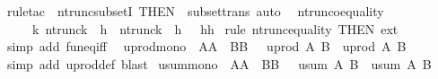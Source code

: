 \begin{isabellebody}
\isamarkupfalse%
\ {\isacharparenleft}rule{\isacharunderscore}tac\ {\isacharbrackleft}{\isacharbang}{\isacharbrackright}\ ntrunc{\isacharunderscore}subsetI\ {\isacharbrackleft}THEN\ {\isacharbrackleft}{}{\isacharbrackright}\ subset{\isacharunderscore}trans{\isacharbrackright}{\isacharcomma}\ auto{\isacharparenright}\ \isanewline
{}\isamarkupfalse%
%
\endisatagproof
{\isafoldproof}%
%
\isadelimproof
\isanewline
%
\endisadelimproof
\isanewline
{}\isamarkupfalse%
\ ntrunc{\isacharunderscore}o{\isacharunderscore}equality{\isacharcolon}\ \isanewline
\ \ \ \ {\isachardoublequoteopen}{\isacharbrackleft}{\isacharbar}\ {\isacharbang}{\isacharbang}k{\isachardot}\ {\isacharparenleft}ntrunc{\isacharparenleft}k{\isacharparenright}\ {\isasymcirc}\ h{}{\isacharparenright}\ {\isacharequal}\ {\isacharparenleft}ntrunc{\isacharparenleft}k{\isacharparenright}\ {\isasymcirc}\ h{}{\isacharparenright}\ {\isacharbar}{\isacharbrackright}\ {\isacharequal}{\isacharequal}{\isachargreater}\ h{}{\isacharequal}h{}{\isachardoublequoteclose}\isanewline
%
\isadelimproof
%
\endisadelimproof
%
\isatagproof
{}\isamarkupfalse%
\ {\isacharparenleft}rule\ ntrunc{\isacharunderscore}equality\ {\isacharbrackleft}THEN\ ext{\isacharbrackright}{\isacharparenright}\isanewline
{}\isamarkupfalse%
\ {\isacharparenleft}simp\ add{\isacharcolon}\ fun{\isacharunderscore}eq{\isacharunderscore}iff{\isacharparenright}\ \isanewline
{}\isamarkupfalse%
%
\endisatagproof
{\isafoldproof}%
%
\isadelimproof
\isanewline
%
\endisadelimproof
\isanewline
\isanewline
\isanewline
\isanewline
{}\isamarkupfalse%
\ uprod{\isacharunderscore}mono{\isacharcolon}\ {\isachardoublequoteopen}{\isacharbrackleft}{\isacharbar}\ A{\isacharless}{\isacharequal}A{\isacharprime}{\isacharsemicolon}\ \ B{\isacharless}{\isacharequal}B{\isacharprime}\ {\isacharbar}{\isacharbrackright}\ {\isacharequal}{\isacharequal}{\isachargreater}\ uprod\ A\ B\ {\isacharless}{\isacharequal}\ uprod\ A{\isacharprime}\ B{\isacharprime}{\isachardoublequoteclose}\isanewline
%
\isadelimproof
%
\endisadelimproof
%
\isatagproof
{}\isamarkupfalse%
\ {\isacharparenleft}simp\ add{\isacharcolon}\ uprod{\isacharunderscore}def{\isacharcomma}\ blast{\isacharparenright}%
\endisatagproof
{\isafoldproof}%
%
\isadelimproof
\isanewline
%
\endisadelimproof
\isanewline
{}\isamarkupfalse%
\ usum{\isacharunderscore}mono{\isacharcolon}\ {\isachardoublequoteopen}{\isacharbrackleft}{\isacharbar}\ A{\isacharless}{\isacharequal}A{\isacharprime}{\isacharsemicolon}\ \ B{\isacharless}{\isacharequal}B{\isacharprime}\ {\isacharbar}{\isacharbrackright}\ {\isacharequal}{\isacharequal}{\isachargreater}\ usum\ A\ B\ {\isacharless}{\isacharequal}\ usum\ A{\isacharprime}\ B{\isacharprime}{\isachardoublequoteclose}\isanewline

\end{isabellebody}
